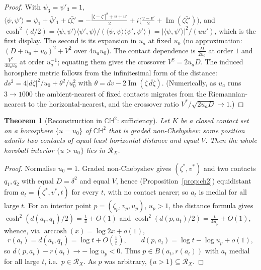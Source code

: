 \documentclass[11pt]{article}
\newtheorem{theorem}{Theorem}[section]
\theoremstyle{remark}
\newcommand{\X}{X}
\newcommand{\Rx}{\mathcal{R}_{\X}}
\begin{document}
\begin{proof}
With $\psi_{3}=\psi'_{3}=1$, $\langle\psi,\psi'\rangle=\psi_{1}+\bar
\psi'_{1}+\zeta\bar\zeta' =-\tfrac{|\zeta-\zeta'|^{2}+u+u'}{2}
+i\bigl(\tfrac{v-v'}{2}+\operatorname{Im}(\zeta\bar\zeta')\bigr)$, and
$\cosh^{2}(d/2)=\langle\psi,\psi'\rangle\langle\psi',\psi\rangle/
(\langle\psi,\psi\rangle\langle\psi',\psi'\rangle)
=|\langle\psi,\psi'\rangle|^{2}/(uu')$, which is the first display. The
second is its expansion in $u_{a}$ at fixed $u_{0}$ (no approximation:
$(D+u_{a}+u_{0})^{2}+V^{2}$ over $4u_{a}u_{0}$). The contact dependence
is $\tfrac{D}{2u_{0}}$ at order $1$ and $\tfrac{V^{2}}{4u_{a}u_{0}}$ at
order $u_{a}^{-1}$; equating them gives the crossover $V^{2}=2u_{a}D$.
The induced horosphere metric follows from the infinitesimal form of
the distance: $ds^{2}=4|d\zeta|^{2}/u_{0}+\theta^{2}/u_{0}^{2}$ with
$\theta=dv-2\operatorname{Im}(\zeta\,\overline{d\zeta})$. (Numerically,
as $u_{a}$ runs $3\to1000$ the ambient-nearest of fixed contacts
migrates from the Riemannian-nearest to the horizontal-nearest, and the
crossover ratio $V^{\ast}/\sqrt{2u_{a}D}\to1$.)
\end{proof}

\begin{theorem}[Reconstruction in $\mathbb{CH}^{2}$: sufficiency]
\label{thm:ch2}
Let $K$ be a closed contact set on a horosphere $\{u=u_{0}\}$ of
$\mathbb{CH}^{2}$ that is \emph{graded non-Chebyshev}: some position
admits two contacts of equal least horizontal distance and equal $V$.
Then the whole horoball interior $\{u>u_{0}\}$ lies in $\Rx$.
\end{theorem}

\begin{proof}
Normalise $u_{0}=1$. Graded non-Chebyshev gives
$(\zeta^{\ast},v^{\ast})$ and two contacts $q_{1},q_{2}$ with equal
$D=\delta^{2}$ and equal $V$, hence (Proposition~\ref{prop:ch2})
equidistant from $a_{t}=(\zeta^{\ast},v^{\ast},t)$ for every $t$, with
no contact nearer; so $a_{t}$ is medial for all large $t$. For an
interior point $p=(\zeta_{p},v_{p},u_{p})$, $u_{p}>1$, the distance
formula gives $\cosh^{2}(d(a_{t},q_{1})/2)=\tfrac{t}{4}+O(1)$ and
$\cosh^{2}(d(p,a_{t})/2)=\tfrac{t}{4u_{p}}+O(1)$, whence, via
$\operatorname{arccosh}(x)=\log 2x+o(1)$,
\[
  r(a_{t})=d(a_{t},q_{1})=\log t+O(\tfrac1t),\qquad
  d(p,a_{t})=\log t-\log u_{p}+o(1),
\]
so $d(p,a_{t})-r(a_{t})\to-\log u_{p}<0$. Thus $p\in B(a_{t},r(a_{t}))$
with $a_{t}$ medial for all large $t$, i.e.\ $p\in\Rx$. As $p$ was
arbitrary, $\{u>1\}\subseteq\Rx$.
\end{proof}
\end{document}

